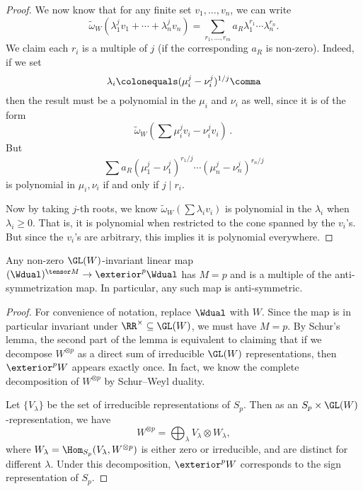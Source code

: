 \begin{proof}
	We now know that for any finite set $v_1, \ldots, v_n$, we can write
	\begin{equation*}
		\tilde{\omega}_W(\lambda_1^j v_1 + \cdots + \lambda_n^j v_n) = \sum_{r_1, \ldots, r_m} a_R \lambda_1^{r_1} \cdots \lambda_n^{r_n}.
	\end{equation*}
	We claim each $r_i$ is a multiple of $j$ (if the corresponding $a_R$ is non-zero). 
	Indeed, if we set
	\begin{equation*}
		\lambda_i \colonequals (\mu_i^j - \nu_i^j)^{1/j} \comma
	\end{equation*}
	then the result must be a polynomial in the $\mu_i$ and $\nu_i$ as well, since it is of the form
	\begin{equation*}
		\tilde{\omega}_W(\sum \mu_i^j v_i - \nu_i^j v_i) \period
	\end{equation*}
	But
	\begin{equation*}
		\sum a_R (\mu_1^j - \nu_1^j)^{r_1/ j} \cdots (\mu_n^j - \nu_n^j)^{r_n/ j}
	\end{equation*}
	is polynomial in $\mu_i, \nu_i$ if and only if $j \mid r_i$.

	Now by taking $j$-th roots, we know $\tilde{\omega}_W(\sum \lambda_i v_i)$ is polynomial in the $\lambda_i$ when $\lambda_i \geq 0$. That is, it is polynomial when restricted to the cone spanned by the $v_i$'s. But since the $v_i$'s are arbitrary, this implies it is polynomial everywhere.
\end{proof}

\begin{lemma}
  Any non-zero $\GL(W)$-invariant linear map $ (\Wdual)^{\tensor M} \to \exterior^p \Wdual$ has $M = p$ and is a multiple of the anti-symmetrization map. In particular, any such map is anti-symmetric.
\end{lemma}

\begin{proof}
  For convenience of notation, replace $\Wdual$ with $W$. Since the map is in particular invariant under $\RR ^\times \subseteq \GL(W)$, we must have $M = p$. By Schur's lemma, the second part of the lemma is equivalent to claiming that if we decompose $W^{\otimes p}$ as a direct sum of irreducible $\GL(W)$ representations, then $\exterior^p W$ appears exactly once. In fact, we know the complete decomposition of $W^{\otimes p}$ by Schur--Weyl duality.

  Let $\{V_\lambda\}$ be the set of irreducible representations of $S_p$. Then as an $S_p \times \GL(W)$-representation, we have
  \begin{equation*}
    W^{\otimes p} = \bigoplus_\lambda V_\lambda \otimes W_\lambda,
  \end{equation*}
  where $W_\lambda = \Hom_{S_p} (V_\lambda, W^{\otimes p})$ is either zero or irreducible, and are distinct for different $\lambda$. Under this decomposition, $\exterior^p W$ corresponds to the sign representation of $S_p$.
\end{proof}

